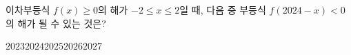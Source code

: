 이차부등식 $f(x)\ge 0$의 해가 $-2\le x\le 2$일 때, 다음 중 부등식 $f(2024-x)<0$의 해가 될 수 있는 것은?
\begin{choices32}{$2023$}{$2024$}{$2025$}{$2026$}{$2027$}\end{choices32}
